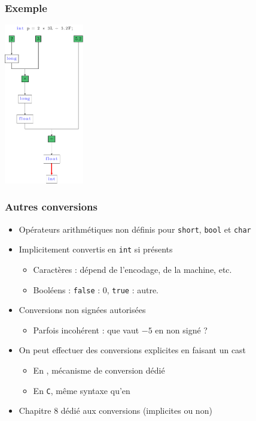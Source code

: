 \begin{frame}
\frametitle{Exemple}
\begin{center}
\includegraphics[height=7cm]{pics/conv.pdf}
\end{center}
\end{frame}

\begin{frame}
\frametitle{Autres conversions}
\begin{itemize}[<+->]
\item Opérateurs arithmétiques non définis pour \lstinline|short|, \lstinline|bool| et \lstinline|char|
\item Implicitement convertis en \lstinline|int| si présents 
	\begin{itemize}
	\item Caractères : dépend de l'encodage, de la machine, etc.
	\item Booléens : \lstinline|false| : $0$, \lstinline|true| : autre.
	\end{itemize}
\item Conversions non signées autorisées
	\begin{itemize}
	\item Parfois incohérent : que vaut $-5$ en non signé ?
	\end{itemize}
\item On peut effectuer des conversions explicites en faisant un cast
	\begin{itemize}
	\item En \cpp, mécanisme de conversion dédié
	\item En \texttt{C}, même syntaxe qu'en \java
	\end{itemize}
\item Chapitre 8 dédié aux conversions (implicites ou non)
\end{itemize}
\end{frame}

